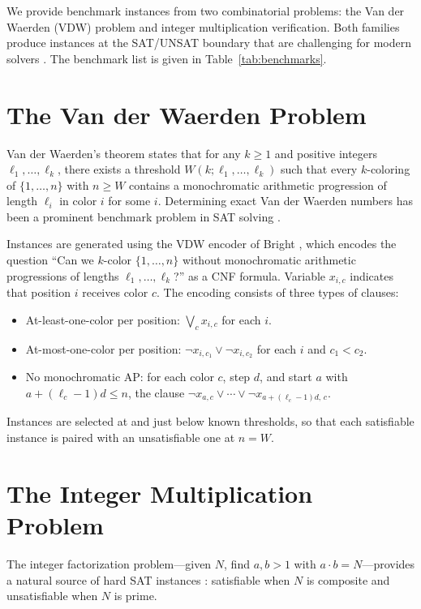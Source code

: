 \documentclass[conference]{IEEEtran}
\begin{document}
We provide benchmark instances from two combinatorial problems: the Van der
Waerden (VDW) problem and integer multiplication verification. Both families
produce instances at the SAT/UNSAT boundary that are challenging for modern
solvers \cite{b1,b2}. The benchmark list is given in Table~\ref{tab:benchmarks}.

\section{The Van der Waerden Problem}

Van der Waerden's theorem \cite{b3} states that for any $k \geq 1$ and positive
integers $\ell_1, \ldots, \ell_k$, there exists a threshold $W(k;\ell_1,\ldots,\ell_k)$
such that every $k$-coloring of $\{1,\ldots,n\}$ with $n \geq W$ contains a
monochromatic arithmetic progression of length $\ell_i$ in color $i$ for some $i$.
Determining exact Van der Waerden numbers has been a prominent benchmark problem
in SAT solving \cite{b4}.

Instances are generated using the VDW encoder of Bright \cite{b6}, which encodes
the question ``Can we $k$-color $\{1,\ldots,n\}$ without monochromatic
arithmetic progressions of lengths $\ell_1,\ldots,\ell_k$?'' as a CNF formula.
Variable $x_{i,c}$ indicates that position $i$ receives color $c$.
The encoding consists of three types of clauses:
\begin{itemize}
  \item At-least-one-color per position: $\bigvee_c x_{i,c}$ for each $i$.
  \item At-most-one-color per position: $\neg x_{i,c_1} \vee \neg x_{i,c_2}$
        for each $i$ and $c_1 < c_2$.
  \item No monochromatic AP: for each color $c$, step $d$, and start $a$
        with $a + (\ell_c-1)d \leq n$, the clause
        $\neg x_{a,c} \vee \cdots \vee \neg x_{a+(\ell_c-1)d,\,c}$.
\end{itemize}
Instances are selected at and just below known thresholds, so that each
satisfiable instance is paired with an unsatisfiable one at $n = W$.

\section{The Integer Multiplication Problem}

The integer factorization problem---given $N$, find $a, b > 1$ with $a \cdot b = N$---provides
a natural source of hard SAT instances \cite{b2}: satisfiable when $N$ is composite
and unsatisfiable when $N$ is prime.
\end{document}
